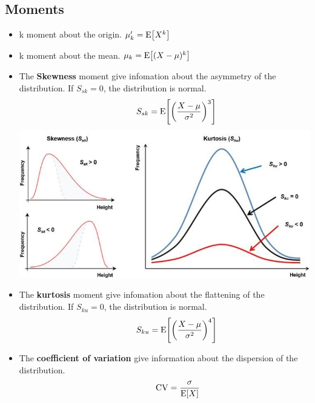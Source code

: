 \documentclass[10pt, french]{article}
\begin{document}
\begin{multicols*}{3}
\section*{Moments}
\begin{itemize}[align=left,leftmargin=*]
    \item k moment about the origin. $\mu_k'=\mathrm{E} {\left[ X^k \right]}$
    \item k moment about the mean. $\mu_k=\mathrm{E} {\left[ (X-\mu)^k \right]}$
    \item The \textbf{Skewness} moment give infomation about the asymmetry of the distribution. If $S_{sk}=0$, the distribution is normal. \[\hspace*{1cm} S_{sk} = \mathrm{E} {\left[ \left(\frac{X-\mu}{\sigma^2}\right)^3 \right]} \] %
    \includegraphics[scale=0.34]{src/Illustration-skewness-and-kurtosis.png}
    \item The \textbf{kurtosis} moment give infomation about the flattening of the distribution. If $S_{ku}=0$, the distribution is normal. \[\hspace*{1cm} S_{ku} = \mathrm{E} {\left[ \left(\frac{X-\mu}{\sigma^2}\right)^4 \right]} \] %
    \item The \textbf{coefficient of variation} give information about the dispersion of the distribution. \[\hspace*{1.1cm} \mathrm{CV} = \frac{\sigma}{\mathrm{E} {\left[ X \right]}} \]
\end{itemize}


\end{multicols*}
\end{document}
